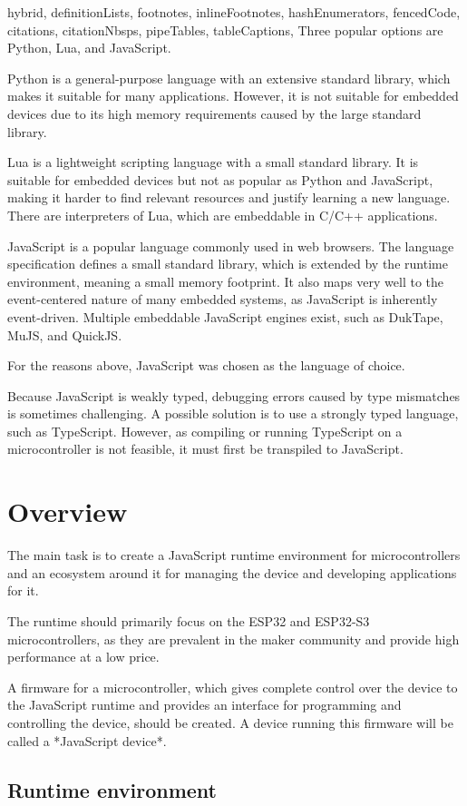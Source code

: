 \begin{markdown*}{%
  hybrid,
  definitionLists,
  footnotes,
  inlineFootnotes,
  hashEnumerators,
  fencedCode,
  citations,
  citationNbsps,
  pipeTables,
  tableCaptions,
}
Three popular options are Python, Lua, and JavaScript.

Python is a general-purpose language with an extensive standard library, which makes it suitable for many applications. However, it is not suitable for embedded devices due to its high memory requirements caused by the large standard library.

Lua is a lightweight scripting language with a small standard library. It is suitable for embedded devices but not as popular as Python and JavaScript, making it harder to find relevant resources and justify learning a new language. There are interpreters of Lua, which are embeddable in C/C++ applications.

JavaScript is a popular language commonly used in web browsers. The language specification defines a small standard library, which is extended by the runtime environment, meaning a small memory footprint. It also maps very well to the event-centered nature of many embedded systems, as JavaScript is inherently event-driven. Multiple embeddable JavaScript engines exist, such as DukTape, MuJS, and QuickJS.

For the reasons above, JavaScript was chosen as the language of choice.

Because JavaScript is weakly typed, debugging errors caused by type mismatches is sometimes challenging. A possible solution is to use a strongly typed language, such as TypeScript. However, as compiling or running TypeScript on a microcontroller is not feasible, it must first be transpiled to JavaScript.


\chapter{Overview}

The main task is to create a JavaScript runtime environment for microcontrollers and an ecosystem around it for managing the device and developing applications for it.

The runtime should primarily focus on the ESP32 and ESP32-S3 microcontrollers, as they are prevalent in the maker community and provide high performance at a low price.

A firmware for a microcontroller, which gives complete control over the device to the JavaScript runtime and provides an interface for programming and controlling the device, should be created. A device running this firmware will be called a *JavaScript device*.

\section{Runtime environment}


\end{markdown*}
